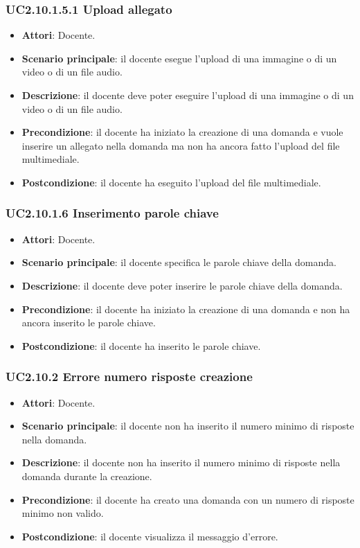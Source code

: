 \subsubsection{UC2.10.1.5.1 Upload allegato}
\begin{itemize}
\item \textbf{Attori}: Docente.
\item \textbf{Scenario principale}: il docente esegue l'upload di una immagine o di un video o di un file audio.
\item \textbf{Descrizione}: il docente deve poter eseguire l'upload di una immagine o di un video o di un file audio.
\item \textbf{Precondizione}: il docente ha iniziato la creazione di una domanda e vuole inserire un allegato nella domanda ma non ha ancora fatto l'upload del file multimediale.
\item \textbf{Postcondizione}: il docente ha eseguito l'upload del file multimediale.
\end{itemize}
\subsubsection{UC2.10.1.6 Inserimento parole chiave}
\begin{itemize}
\item \textbf{Attori}: Docente.
\item \textbf{Scenario principale}: il docente specifica le parole chiave della domanda.
\item \textbf{Descrizione}: il docente deve poter inserire le parole chiave della domanda.
\item \textbf{Precondizione}: il docente ha iniziato la creazione di una domanda e non ha ancora inserito le parole chiave.
\item \textbf{Postcondizione}: il docente ha inserito le parole chiave.
\end{itemize}
\subsubsection{UC2.10.2 Errore numero risposte creazione}
\begin{itemize}
\item \textbf{Attori}: Docente.
\item \textbf{Scenario principale}: il docente non ha inserito il numero minimo di risposte nella domanda.
\item \textbf{Descrizione}: il docente non ha inserito il numero minimo di risposte nella domanda durante la creazione.
\item \textbf{Precondizione}: il docente ha creato una domanda con un numero di risposte minimo non valido.
\item \textbf{Postcondizione}: il docente visualizza il messaggio d'errore.
\end{itemize}
